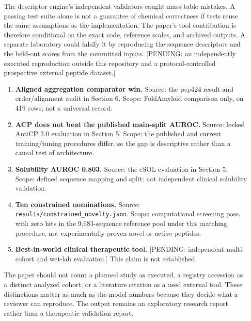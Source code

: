 The descriptor engine's independent validators caught mass-table mistakes. A passing test suite alone is not a guarantee of chemical correctness if tests reuse the same assumptions as the implementation. The paper's tool contribution is therefore conditional on the exact code, reference scales, and archived outputs. A separate laboratory could falsify it by reproducing the sequence descriptors and the held-out scores from the committed inputs. {[}PENDING: an independently executed reproduction outside this repository and a protocol-controlled prospective external peptide dataset.{]}


\begin{enumerate}
\def\labelenumi{\arabic{enumi}.}
\tightlist
\item
  \textbf{Aligned aggregation comparator win.} Source: the pep424 result and order/alignment audit in Section 6. Scope: FoldAmyloid comparison only, on 419 rows; not a universal record.
\item
  \textbf{ACP does not beat the published main-split AUROC.} Source: locked AntiCP 2.0 evaluation in Section 5. Scope: the published and current training/tuning procedures differ, so the gap is descriptive rather than a causal test of architecture.
\item
  \textbf{Solubility AUROC 0.803.} Source: the eSOL evaluation in Section 5. Scope: defined sequence mapping and split; not independent clinical solubility validation.
\item
  \textbf{Ten constrained nominations.} Source: \texttt{results/constrained\_novelty.json}. Scope: computational screening pass, with zero hits in the 9,683-sequence reference pool under this matching procedure, not experimentally proven novel or active peptides.
\item
  \textbf{Best-in-world clinical therapeutic tool.} {[}PENDING: independent multi-cohort and wet-lab evaluation.{]} This claim is not established.
\end{enumerate}

The paper should not count a planned study as executed, a registry accession as a distinct analyzed cohort, or a literature citation as a used external tool. These distinctions matter as much as the model numbers because they decide what a reviewer can reproduce. The output remains an exploratory research report rather than a therapeutic validation report.
